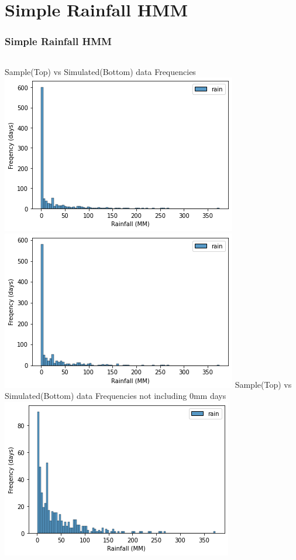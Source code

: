 \documentclass{beamer}
\begin{document}
    \section{Simple Rainfall HMM}
    \begin{frame}
        \frametitle{Simple Rainfall HMM}
        \begin{columns}
            Sample(Top) vs Simulated(Bottom) data Frequencies
            \includegraphics[width=0.8\linewidth]{HMM_Only/0_freq_data.png}
            \includegraphics[width=0.8\linewidth]{HMM_Only/0_freq_sim.png}
            Sample(Top) vs Simulated(Bottom) data Frequencies not including 0mm days
            \includegraphics[width=0.8\linewidth]{HMM_Only/_freq_data.png}

\end{columns}
\end{frame}
\end{document}
